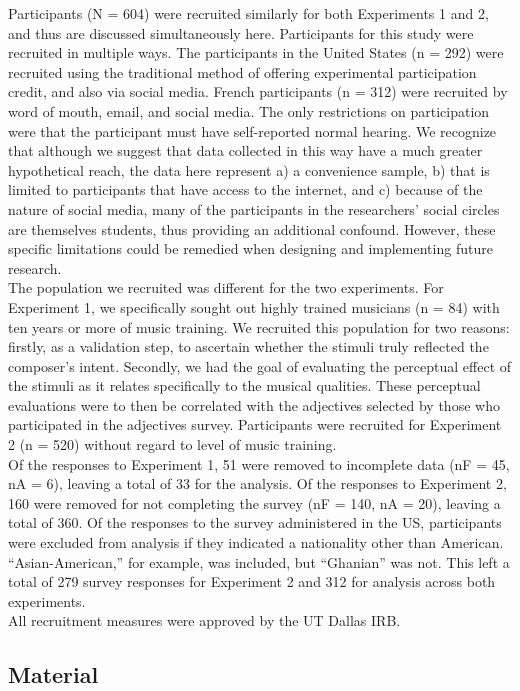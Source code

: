 \documentclass[
  english,
  man,floatsintext]{apa6}
\begin{document}
Participants (N = 604) were recruited similarly for both Experiments 1 and 2, and thus are discussed simultaneously here. Participants for this study were recruited in multiple ways. The participants in the United States (n = 292) were recruited using the traditional method of offering experimental participation credit, and also via social media. French participants (n = 312) were recruited by word of mouth, email, and social media. The only restrictions on participation were that the participant must have self-reported normal hearing. We recognize that although we suggest that data collected in this way have a much greater hypothetical reach, the data here represent a) a convenience sample, b) that is limited to participants that have access to the internet, and c) because of the nature of social media, many of the participants in the researchers' social circles are themselves students, thus providing an additional confound. However, these specific limitations could be remedied when designing and implementing future research.\\
The population we recruited was different for the two experiments. For Experiment 1, we specifically sought out highly trained musicians (n = 84) with ten years or more of music training. We recruited this population for two reasons: firstly, as a validation step, to ascertain whether the stimuli truly reflected the composer's intent. Secondly, we had the goal of evaluating the perceptual effect of the stimuli as it relates specifically to the musical qualities. These perceptual evaluations were to then be correlated with the adjectives selected by those who participated in the adjectives survey. Participants were recruited for Experiment 2 (n = 520) without regard to level of music training.\\
Of the responses to Experiment 1, 51 were removed to incomplete data (nF = 45, nA = 6), leaving a total of 33 for the analysis. Of the responses to Experiment 2, 160 were removed for not completing the survey (nF = 140, nA = 20), leaving a total of 360. Of the responses to the survey administered in the US, participants were excluded from analysis if they indicated a nationality other than American. ``Asian-American,'' for example, was included, but ``Ghanian'' was not. This left a total of 279 survey responses for Experiment 2 and 312 for analysis across both experiments.\\
All recruitment measures were approved by the UT Dallas IRB.

\hypertarget{material}{%
\subsection{Material}\label{material}}
\end{document}
